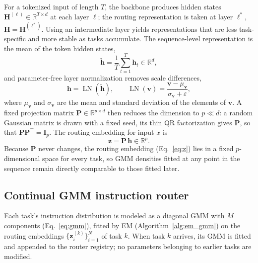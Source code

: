 For a tokenized input of length $T$, the backbone produces hidden states $\mathbf{H}^{(\ell)}\in\mathbb{R}^{T\times d}$ at each layer $\ell$; the routing representation is taken at layer $\ell^*$, $\mathbf{H}=\mathbf{H}^{(\ell^*)}$. Using an intermediate layer yields representations that are less task-specific and more stable as tasks accumulate. The sequence-level representation is the mean of the token hidden states,
\begin{equation}
    \tilde{\mathbf{h}} = \frac{1}{T}\sum_{t=1}^{T} \mathbf{h}_t \in \mathbb{R}^d,
    \label{eq:meanpool}
\end{equation}
and parameter-free layer normalization removes scale differences,
\begin{equation}
    \mathbf{h} = \operatorname{LN}(\tilde{\mathbf{h}}), \qquad
    \operatorname{LN}(\mathbf{v}) = \frac{\mathbf{v} - \mu_{\mathbf{v}}}{\sigma_{\mathbf{v}} + \varepsilon},
    \label{eq:ln}
\end{equation}
where $\mu_\mathbf{v}$ and $\sigma_\mathbf{v}$ are the mean and standard deviation of the elements of $\mathbf{v}$. A fixed projection matrix $\mathbf{P}\in\mathbb{R}^{p\times d}$ then reduces the dimension to $p\ll d$: a random Gaussian matrix is drawn with a fixed seed, its thin QR factorization gives $\mathbf{P}$, so that $\mathbf{P}\mathbf{P}^\top=\mathbf{I}_p$. The routing embedding for input $x$ is
\begin{equation}
    \mathbf{z} = \mathbf{P}\,\mathbf{h} \in \mathbb{R}^p.
    \label{eq:z}
\end{equation}
Because $\mathbf{P}$ never changes, the routing embedding (Eq.~\eqref{eq:z}) lies in a fixed $p$-dimensional space for every task, so GMM densities fitted at any point in the sequence remain directly comparable to those fitted later.

\subsection{Continual GMM instruction router}
\label{sec:router}

Each task's instruction distribution is modeled as a diagonal GMM with $M$ components (Eq.~\eqref{eq:gmm}), fitted by EM (Algorithm~\ref{alg:em_gmm}) on the routing embeddings $\{\mathbf{z}_i^{(k)}\}_{i=1}^N$ of task $k$. When task $k$ arrives, its GMM is fitted and appended to the router registry; no parameters belonging to earlier tasks are modified.


